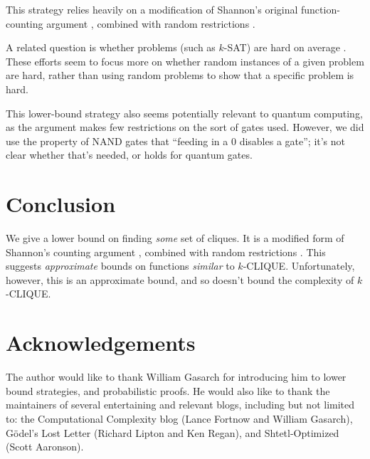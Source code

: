 \documentclass[12pt]{article}
\theoremstyle{definition}
\begin{document}
This strategy relies heavily on a modification of Shannon's original
function-counting argument \cite{shannon_synthesis_1949},
combined with random restrictions
\cite{subbotovskaya1963comparison}\cite{hastad1987lower}.

A related question is whether problems
(such as $k$-SAT) are
hard on average \cite{bogdanov2006average}.
These efforts seem to focus more on whether
random
instances of a given problem are hard, rather
than using random problems to show that
a specific problem is hard.

This lower-bound strategy also seems potentially
relevant to quantum computing,
as the argument makes few restrictions on the sort of gates used.
However, we did use the property of NAND gates that ``feeding in
a 0 disables a gate''; it's not clear whether that's needed,
or holds for quantum gates.

\section{Conclusion}

We give a lower bound on finding {\em some} set of cliques.
It is a modified form of Shannon's counting argument
\cite{shannon_synthesis_1949}, combined with random restrictions
\cite{subbotovskaya1963comparison} \cite{hastad1987lower}.
This suggests {\em approximate} bounds on functions {\em similar} to $k$-CLIQUE.
Unfortunately, however, this is an approximate bound,
and so doesn't bound the complexity of $k$-CLIQUE.

\section{Acknowledgements}

The author would like to thank William Gasarch for introducing him
to lower bound strategies, and probabilistic proofs.
He would also like to thank the maintainers of
several entertaining and relevant blogs, including but
not limited to: the Computational Complexity blog
(Lance Fortnow and William Gasarch), 
G\"odel's Lost Letter (Richard Lipton and Ken Regan),
and Shtetl-Optimized (Scott Aaronson). 



\end{document}
